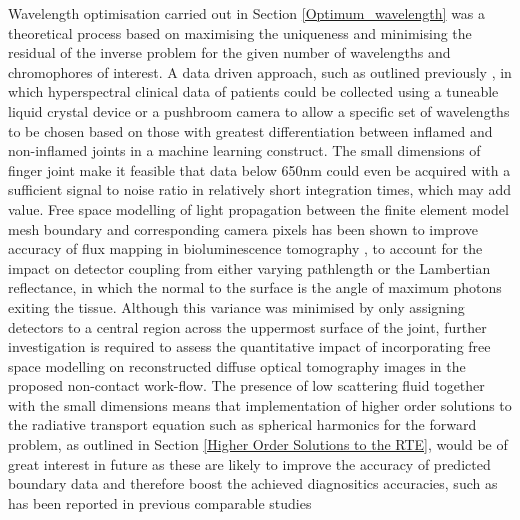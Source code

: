 \documentclass[twoside]{bhamthesis}
\theoremstyle{definition}
\begin{document}
Wavelength optimisation carried out in Section \ref{Optimum_wavelength} was a theoretical process based on maximising the uniqueness and minimising the residual of the inverse problem for the given number of wavelengths and chromophores of interest. A data driven approach, such as outlined previously \cite{dempsey2015data}, in which hyperspectral clinical data of patients could be collected using a tuneable liquid crystal device \cite{woltman2007liquid} or a pushbroom camera \cite{li2013review} to allow a specific set of wavelengths to be chosen based on those with greatest differentiation between inflamed and non-inflamed joints in a machine learning construct. The small dimensions of finger joint make it feasible that data below 650nm could even be acquired with a sufficient signal to noise ratio in relatively short integration times, which may add value. Free space modelling of light propagation between the finite element model mesh boundary and corresponding camera pixels has been shown to improve accuracy of flux mapping in bioluminescence tomography \cite{guggenheim2014multi}, to account for the impact on detector coupling from either varying pathlength or the Lambertian reflectance, in which the normal to the surface is the angle of maximum photons exiting the tissue. Although this variance was minimised by only assigning detectors to a central region across the uppermost surface of the joint, further investigation is required to assess the quantitative impact of incorporating free space modelling on reconstructed diffuse optical tomography images in the proposed non-contact work-flow. The presence of low scattering fluid together with the small dimensions means that implementation of higher order solutions to the radiative transport equation such as spherical harmonics for the forward problem, as outlined in Section \ref{Higher Order Solutions to the RTE}, would be of great interest in future as these are likely to improve the accuracy of predicted boundary data and therefore boost the achieved diagnositics accuracies, such as has been reported in previous comparable studies \cite{montejo2014computational,yuan2009comparison}
\end{document}
